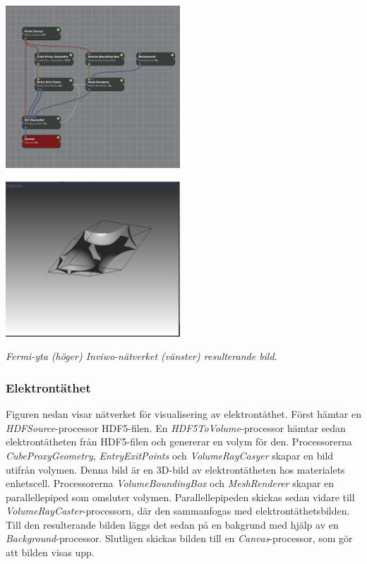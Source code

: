 \documentclass[10pt,oneside,swedish]{article}
\begin{document}
\includegraphics[width=0.49000\textwidth]{Images/fermi_network.png}

\includegraphics[width=0.49000\textwidth]{Images/fermi_canvas.png}

\emph{Fermi-yta (höger) Inviwo-nätverket (vänster) resulterande bild.}

\subsubsection{Elektrontäthet}\label{elektrontuxe4thet}

Figuren nedan visar nätverket för visualisering av elektrontäthet. Först
hämtar en \emph{HDFSource}-processor HDF5-filen. En
\emph{HDF5ToVolume}-processor hämtar sedan elektrontätheten från
HDF5-filen och genererar en volym för den. Processorerna
\emph{CubeProxyGeometry}, \emph{EntryExitPoints} och
\emph{VolumeRayCasyer} skapar en bild utifrån volymen. Denna bild är en
3D-bild av elektrontätheten hos materialets enhetscell. Processorerna
\emph{VolumeBoundingBox} och \emph{MeshRenderer} skapar en
parallellepiped som omsluter volymen. Parallellepipeden skickas sedan
vidare till \emph{VolumeRayCaster}-processorn, där den sammanfogas med
elektrontäthetsbilden. Till den resulterande bilden läggs det sedan på
en bakgrund med hjälp av en \emph{Background}-processor. Slutligen
skickas bilden till en \emph{Canvas}-processor, som gör att bilden visas
upp.
\end{document}
